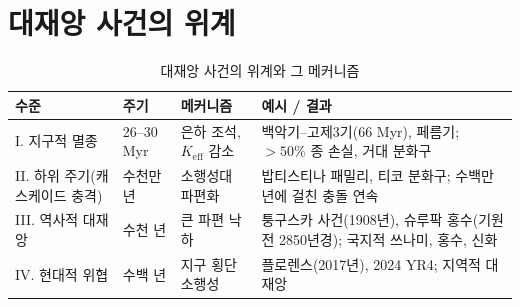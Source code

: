 \documentclass[12pt,a4paper]{article}
\begin{document}
	\section{대재앙 사건의 위계}
	\begin{table}[!ht]
		\centering
		\caption{대재앙 사건의 위계와 그 메커니즘}
		\label{tab:hierarchy}
		\scriptsize
		\begin{tabular}{p{3.5cm}p{2.4cm}p{3.4cm}p{7.5cm}}
			\toprule
			\textbf{수준} & \textbf{주기} & \textbf{메커니즘} & \textbf{예시 / 결과} \\
			\midrule
			I. 지구적 멸종 & 26–30 Myr & 은하 조석, \(K_{\mathrm{eff}}\) 감소 & 백악기–고제3기(66 Myr), 페름기; \(>50\%\) 종 손실, 거대 분화구 \\
			II. 하위 주기(캐스케이드 충격) & 수천만 년 & 소행성대 파편화 & 밥티스티나 패밀리, 티코 분화구; 수백만 년에 걸친 충돌 연속 \\
			III. 역사적 대재앙 & 수천 년 & 큰 파편 낙하 & 퉁구스카 사건(1908년), 슈루팍 홍수(기원전 2850년경); 국지적 쓰나미, 홍수, 신화 \\
			IV. 현대적 위협 & 수백 년 & 지구 횡단 소행성 & 플로렌스(2017년), 2024 YR4; 지역적 대재앙 \\
			\bottomrule
		\end{tabular}
	\end{table}
	
\end{document}
